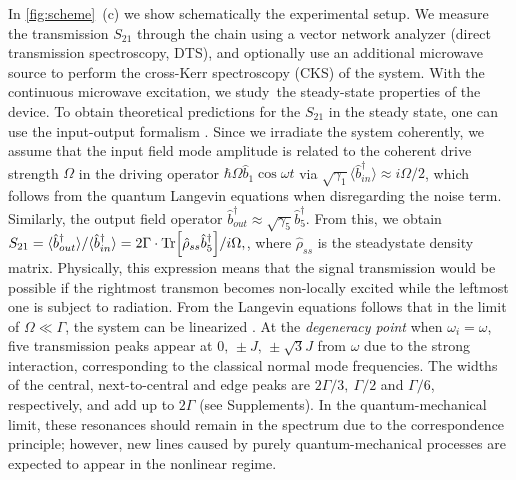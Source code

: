 \documentclass[%
 aps, prl,
 amsmath,amssymb,
 reprint,%
superscriptaddress
]{revtex4-2}
\begin{document}
In \autoref{fig:scheme}~(c) we show schematically the experimental setup. We measure the transmission $S_{21}$ through the chain using a vector network analyzer (direct transmission spectroscopy, DTS), and optionally use an additional microwave source to perform the cross-Kerr spectroscopy (CKS) of the system. With the continuous microwave excitation, we study the steady-state properties of the device. To obtain theoretical predictions for the $S_{21}$ in the steady state, one can use the input-output formalism \cite{yurke1984quantum,gardiner1985input}. Since we irradiate the system coherently, we assume that the input field mode amplitude is related to the coherent drive strength $\Omega$ in the driving operator $\hbar \Omega \hat b_1 \cos \omega t$ via $\sqrt{\gamma_1} \langle  \hat b_{in}^\dag \rangle \approx i \Omega/2$, which follows from the quantum Langevin equations when disregarding the noise term. Similarly, the output field operator $\hat b_{out}^\dag \approx \sqrt{\gamma_5} \hat b_5^\dag$. From this, we obtain $
	S_{21} = \langle \hat b_{out}^\dag\rangle / \langle \hat b_{in}^\dag \rangle = 2\Gamma\cdot \Tr[\hat \rho_{ss} \hat b_5^\dag]/{i\Omega} ,
$,
where $\hat \rho_{ss}$ is the steadystate density matrix. Physically, this expression means that the signal transmission would be possible if the rightmost transmon becomes non-locally excited while the leftmost one is subject to radiation. From the Langevin equations follows that in the limit of $\Omega \ll \Gamma$, the system can be linearized \cite{astafiev2010resonance}. At the \textit{degeneracy point} when $\omega_i = \omega$, five transmission peaks appear at $0,\, \pm J,\, \pm \sqrt{3} J$ from $\omega$ due to the strong interaction, corresponding to the classical normal mode frequencies. The widths of the central, next-to-central and edge peaks are $2\Gamma/3,\ \Gamma/2$ and $\Gamma/6$, respectively, and add up to $2\Gamma$ (see Supplements).  In the quantum-mechanical limit, these resonances should remain in the spectrum due to the correspondence principle; however, new lines caused by purely quantum-mechanical processes are expected to appear in the nonlinear regime.
\end{document}
